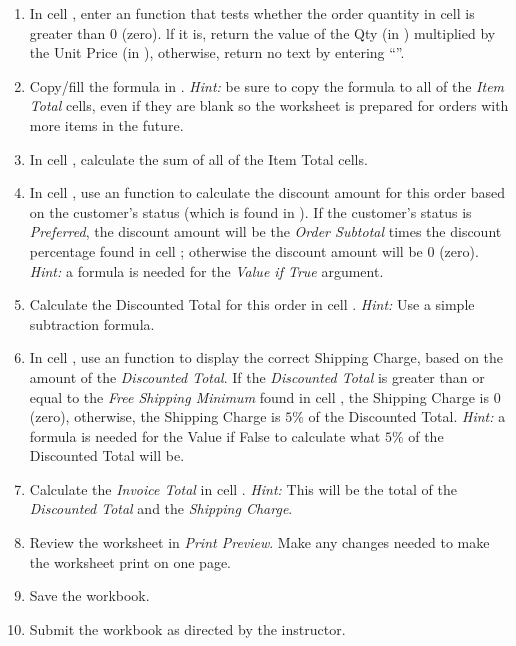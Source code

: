 \begin{enumerate}
\item In cell , enter an  function that tests whether the order quantity in cell  is greater than $ 0 $ (zero). lf it is, return the value of the Qty (in ) multiplied by the Unit Price (in ), otherwise, return no text by entering ``''.
\item Copy/fill the formula in  . \textit{Hint:} be sure to copy the formula to all of the \textit{Item Total} cells, even if they are blank so the worksheet is prepared for orders with more items in the future.
\item In cell , calculate the sum of all of the Item Total cells.
\item In cell , use an  function to calculate the discount amount for this order based on the customer's status (which is found in ). If the customer's status is \textit{Preferred}, the discount amount will be the \textit{Order Subtotal} times the discount percentage found in cell ; otherwise the discount amount will be $ 0 $ (zero). \textit{Hint:} a formula is needed for the \textit{Value if True} argument.
\item Calculate the Discounted Total for this order in cell . \textit{Hint:} Use a simple subtraction formula.
\item In cell , use an  function to display the correct Shipping Charge, based on the amount of the \textit{Discounted Total}. If the \textit{Discounted Total} is greater than or equal to the \textit{Free Shipping Minimum} found in cell , the Shipping Charge is $ 0 $ (zero), otherwise, the Shipping Charge is $ 5\% $ of the Discounted Total. \textit{Hint:} a formula is needed for the Value if False to calculate what $ 5\% $ of the Discounted Total will be.
\item Calculate the \textit{Invoice Total} in cell . \textit{Hint:} This will be the total of the \textit{Discounted Total} and the \textit{Shipping Charge}.
\item Review the worksheet in \textit{Print Preview}. Make any changes needed to make the worksheet print on one page.
\item Save the  workbook.
\item Submit the  workbook as directed by the instructor.
\end{enumerate}
